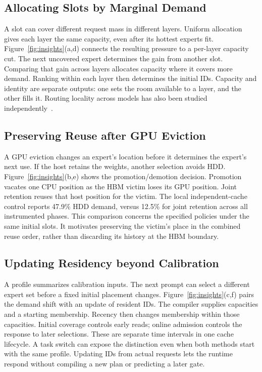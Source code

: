\documentclass[conference,9pt,letterpaper]{IEEEtran}
\begin{document}
\subsection{Allocating Slots by Marginal Demand}
A slot can cover different request mass in different layers. Uniform allocation gives each layer the same capacity, even after its hottest experts fit. Figure~\ref{fig:insights}(a,d) connects the resulting pressure to a per-layer capacity cut. The next uncovered expert determines the gain from another slot. Comparing that gain across layers allocates capacity where it covers more demand. Ranking within each layer then determines the initial IDs. Capacity and identity are separate outputs: one sets the room available to a layer, and the other fills it. Routing locality across models has also been studied independently~\cite{routingconsistency}.

\subsection{Preserving Reuse after GPU Eviction}
A GPU eviction changes an expert's location before it determines the expert's next use. If the host retains the weights, another selection avoids HDD. Figure~\ref{fig:insights}(b,e) shows the promotion/demotion decision. Promotion vacates one CPU position as the HBM victim loses its GPU position. Joint retention reuses that host position for the victim. The local independent-cache control reports 47.9\% HDD demand, versus 12.5\% for joint retention across all instrumented phases. This comparison concerns the specified policies under the same initial slots. It motivates preserving the victim's place in the combined reuse order, rather than discarding its history at the HBM boundary.

\subsection{Updating Residency beyond Calibration}
A profile summarizes calibration inputs. The next prompt can select a different expert set before a fixed initial placement changes. Figure~\ref{fig:insights}(c,f) pairs the demand shift with an update of resident IDs. The compiler supplies capacities and a starting membership. Recency then changes membership within those capacities. Initial coverage controls early reads; online admission controls the response to later selections. These are separate time intervals in one cache lifecycle. A task switch can expose the distinction even when both methods start with the same profile. Updating IDs from actual requests lets the runtime respond without compiling a new plan or predicting a later gate.
\end{document}
